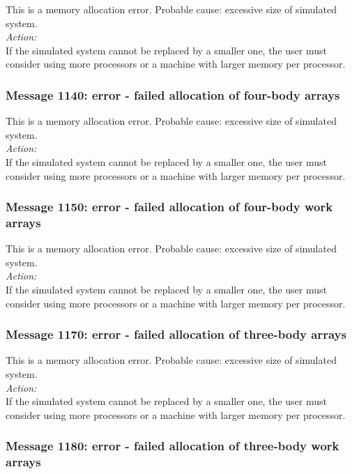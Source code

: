 This is a memory allocation error. Probable cause: excessive size of
simulated system. \\

\noindent
{\em Action:}\\
If the simulated system cannot be replaced by a smaller one, the user
must consider using more processors or a machine with larger memory
per processor.

\subsubsection*{Message 1140: error - failed allocation of four-body
arrays}

This is a memory allocation error. Probable cause: excessive size of
simulated system. \\

\noindent
{\em Action:}\\
If the simulated system cannot be replaced by a smaller one, the user
must consider using more processors or a machine with larger memory
per processor.

\subsubsection*{Message 1150: error - failed allocation of four-body
work arrays}

This is a memory allocation error. Probable cause: excessive size of
simulated system. \\

\noindent
{\em Action:}\\
If the simulated system cannot be replaced by a smaller one, the user
must consider using more processors or a machine with larger memory
per processor.

\subsubsection*{Message 1170: error - failed allocation of three-body
arrays}

This is a memory allocation error. Probable cause: excessive size of
simulated system. \\

\noindent
{\em Action:}\\
If the simulated system cannot be replaced by a smaller one, the user
must consider using more processors or a machine with larger memory
per processor.

\subsubsection*{Message 1180: error - failed allocation of three-body
work arrays}


